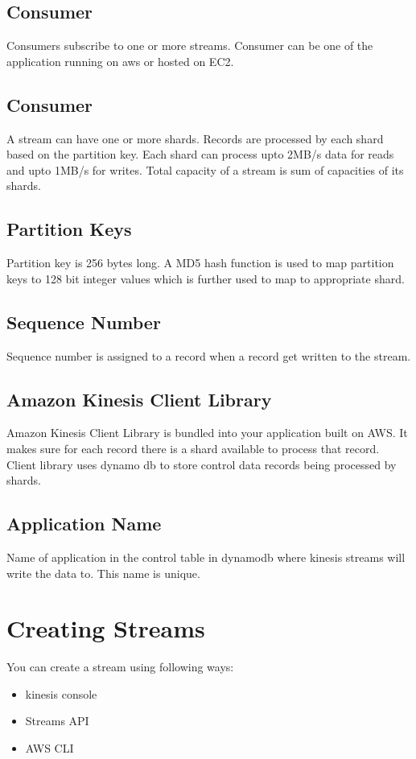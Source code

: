 \documentclass[9pt,twocolumn,twoside]{styles/osajnl}
\begin{document}
\subsection{Consumer}
 Consumers subscribe to one or more streams.  Consumer can be one of the application  running on aws or hosted on EC2.
 
\subsection{Consumer}
A stream can have one or more shards. Records are processed by each shard based on the partition key. Each shard can process upto 2MB/s data for reads and upto 1MB/s for writes. Total capacity of a stream is sum of capacities of its shards.

\subsection{Partition Keys} 
Partition key is 256 bytes long. A MD5 hash function is used to map partition keys to 128 bit integer values which is further used to map to appropriate shard.

\subsection{Sequence Number}
Sequence number is assigned to a record when a record get written to the stream. 

\subsection{Amazon Kinesis Client Library}
Amazon Kinesis Client Library is bundled into your application built on AWS. It makes sure for each record there is a shard available to process that record. Client library uses dynamo db to store control data records being processed by shards.

\subsection{Application Name}
Name of application in the control table in dynamodb where kinesis streams will write the data to. This name is unique.

\section{Creating Streams}

You can create a stream using following ways:
\begin{itemize}
	\item kinesis console
	\item Streams API
	\item AWS CLI
\end{itemize}
\end{document}
